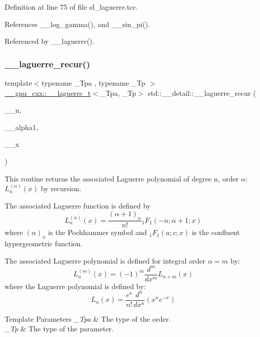 Definition at line 75 of file sf\+\_\+laguerre.\+tcc.



References \+\_\+\+\_\+log\+\_\+gamma(), and \+\_\+\+\_\+sin\+\_\+pi().



Referenced by \+\_\+\+\_\+laguerre().

\mbox{\label{namespacestd_1_1____detail_ab5344b00cf4ed8b39c9132ce0b9287af}} 
\subsubsection{\texorpdfstring{\+\_\+\+\_\+laguerre\+\_\+recur()}{\_\_laguerre\_recur()}}
{\footnotesize\ttfamily template$<$typename \+\_\+\+Tpa , typename \+\_\+\+Tp $>$ \\
\hyperlink{struct____gnu__cxx_1_1____laguerre__t}{\+\_\+\+\_\+gnu\+\_\+cxx\+::\+\_\+\+\_\+laguerre\+\_\+t}$<$\+\_\+\+Tpa, \+\_\+\+Tp$>$ std\+::\+\_\+\+\_\+detail\+::\+\_\+\+\_\+laguerre\+\_\+recur (\begin{DoxyParamCaption}\item[{unsigned int}]{\+\_\+\+\_\+n,  }\item[{\+\_\+\+Tpa}]{\+\_\+\+\_\+alpha1,  }\item[{\+\_\+\+Tp}]{\+\_\+\+\_\+x }\end{DoxyParamCaption})}



This routine returns the associated Laguerre polynomial of degree {\ttfamily n}, order {\ttfamily $ \alpha $}\+: $ L_n^{(\alpha)}(x) $ by recursion. 

The associated Laguerre function is defined by \[ L_n^{(\alpha)}(x) = \frac{(\alpha + 1)_n}{n!} {}_1F_1(-n; \alpha + 1; x) \] where $ (\alpha)_n $ is the Pochhammer symbol and $ {}_1F_1(a; c; x) $ is the confluent hypergeometric function.

The associated Laguerre polynomial is defined for integral order $ \alpha = m $ by\+: \[ L_n^{(m)}(x) = (-1)^m \frac{d^m}{dx^m} L_{n + m}(x) \] where the Laguerre polynomial is defined by\+: \[ L_n(x) = \frac{e^x}{n!} \frac{d^n}{dx^n} (x^ne^{-x}) \]


\begin{DoxyTemplParams}{Template Parameters}
{\em \+\_\+\+Tpa} & The type of the order. \\
\hline
{\em \+\_\+\+Tp} & The type of the parameter. \\
\hline
\end{DoxyTemplParams}

